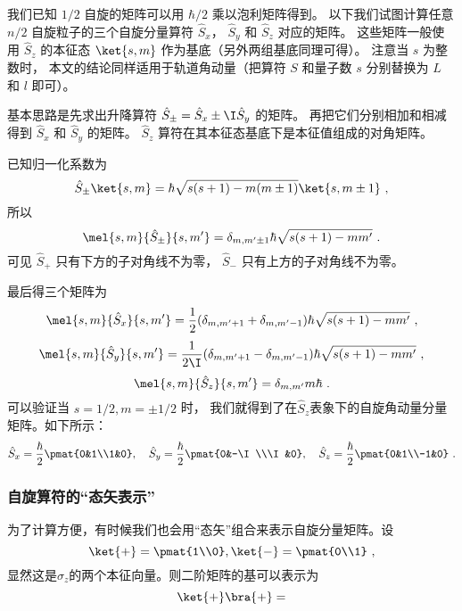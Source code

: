 

我们已知 $1/2$ 自旋的矩阵可以用 $\hbar/2$ 乘以泡利矩阵得到。 以下我们试图计算任意 $n/2$ 自旋粒子的三个自旋分量算符 $\hat S_x$， $\hat S_y$ 和 $\hat S_z$ 对应的矩阵。 这些矩阵一般使用 $\hat S_z$ 的本征态 $\ket{s, m}$ 作为基底（另外两组基底同理可得）。 注意当 $s$ 为整数时， 本文的结论同样适用于轨道角动量（把算符 $S$ 和量子数 $s$ 分别替换为 $L$ 和 $l$ 即可）。

基本思路是先求出升降算符 $\hat S_\pm = \hat S_x \pm \I \hat S_y$ 的矩阵。 再把它们分别相加和相减得到 $\hat S_x$ 和 $\hat S_y$ 的矩阵。 $\hat S_z$ 算符在其本征态基底下是本征值组成的对角矩阵。

已知归一化系数为
\begin{equation}
\hat S_\pm \ket{s,m} = \hbar \sqrt{s(s + 1) - m(m \pm 1)} \ket{s,m\pm1}~,
\end{equation}
所以
\begin{equation}
\mel{s,m}{\hat S_\pm}{s,m'} = \delta_{m, m'\pm1} \hbar \sqrt{s(s + 1) - mm'}~.
\end{equation}
可见 $\hat S_+$ 只有下方的子对角线不为零， $\hat S_-$ 只有上方的子对角线不为零。

最后得三个矩阵为
\begin{equation}
\mel{s,m}{\hat S_x}{s,m'} = \frac12(\delta_{m, m'+1} + \delta_{m, m'-1})\hbar \sqrt{s(s + 1) - mm'} ~,
\end{equation}
\begin{equation}
\mel{s,m}{\hat S_y}{s,m'} = \frac{1}{2\I}(\delta_{m, m'+1} - \delta_{m, m'-1}) \hbar \sqrt{s(s + 1) - mm'}~,
\end{equation}
\begin{equation}
\mel{s,m}{\hat S_z}{s,m'} = \delta_{m,m'} m\hbar ~.
\end{equation}
可以验证当 $s = 1/2, m = \pm1/2$ 时， 我们就得到了在$\hat S_z$表象下的自旋角动量分量矩阵。如下所示：
\begin{equation}
\hat S_x=\frac{\hbar}{2}\pmat{0&1\\1&0},\quad\hat S_y=\frac{\hbar}{2}\pmat{0&-\I\\\I&0},\quad\hat S_z=\frac{\hbar}{2}\pmat{0&1\\-1&0}~.
\end{equation}

\subsubsection{自旋算符的“态矢表示”}
为了计算方便，有时候我们也会用“态矢”组合来表示自旋分量矩阵。设
\begin{equation}
\ket{+}=\pmat{1\\0},\ket{-}=\pmat{0\\1}~,
\end{equation}
显然这是$\hat \sigma_z$的两个本征向量。则二阶矩阵的基可以表示为
\begin{equation}
\ket{+}\bra{+}=
\end{equation}

